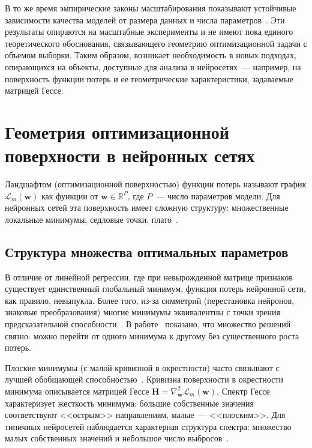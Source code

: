 В то же время эмпирические законы масштабирования показывают устойчивые зависимости качества моделей от размера данных и числа параметров~\cite{kaplan2020scaling,hoffmann2022chinchila}. Эти результаты опираются на масштабные эксперименты и не имеют пока единого теоретического обоснования, связывающего геометрию оптимизационной задачи с объемом выборки. Таким образом, возникает необходимость в новых подходах, опирающихся на объекты, доступные для анализа в нейросетях~--- например, на поверхность функции потерь и ее геометрические характеристики, задаваемые матрицей Гессе.

\section{Геометрия оптимизационной поверхности в нейронных сетях}

Ландшафтом (оптимизационной поверхностью) функции потерь называют график $\mathcal{L}_m(\mathbf{w})$ как функции от $\mathbf{w} \in \mathbb{R}^P$, где $P$~--- число параметров модели. Для нейронных сетей эта поверхность имеет сложную структуру: множественные локальные минимумы, седловые точки, плато~\cite{li2018visualizing,fort2019large}.

\subsection{Структура множества оптимальных параметров}

В отличие от линейной регрессии, где при невырожденной матрице признаков существует единственный глобальный минимум, функция потерь нейронной сети, как правило, невыпукла. Более того, из-за симметрий (перестановка нейронов, знаковые преобразования) многие минимумы эквивалентны с точки зрения предсказательной способности~\cite{draxler2018essentially}. В работе~\cite{garipov2018loss} показано, что множество решений связно: можно перейти от одного минимума к другому без существенного роста потерь.

Плоские минимумы (с малой кривизной в окрестности) часто связывают с лучшей обобщающей способностью~\cite{chaudhari2019entropy}. Кривизна поверхности в окрестности минимума описывается матрицей Гессе $\mathbf{H} = \nabla^2_{\mathbf{w}} \mathcal{L}_m(\mathbf{w})$. Спектр Гессе характеризует жесткость минимума: большие собственные значения соответствуют <<острым>> направлениям, малые~--- <<плоским>>. Для типичных нейросетей наблюдается характерная структура спектра: множество малых собственных значений и небольшое число выбросов~\cite{papyan2019spectrum}.

